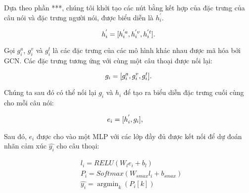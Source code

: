 Dựa theo phần ***,  chúng tôi khởi tạo các nút bằng kết hợp của đặc trưng của câu nói và đặc trưng người nói, được biểu diễn là $h^{'}_{i}$.


\begin{small}
\begin{equation}
    \centering
    h^{'}_{i} = [h^{'a}_{i}, h^{'v}_{i}, h^{'t}_{i}].
\end{equation}
\end{small}
Gọi $g_{i}^a$, $g_{i}^v$ và $g_{i}^t$ là các đặc trưng của các mô hình khác nhau được mã hóa bởi GCN. Các đặc trưng tương ứng với cùng một câu thoại được nối lại: 

\begin{small}
\begin{equation}
    \centering
    g_{i} = [g_{i}^a, g_{i}^v, g_{i}^t].
\end{equation}
\end{small}
Chúng ta sau đó có thể nối lại $g_{i}$ và $h_{i}$ để tạo ra biểu diễn đặc trưng cuối cùng cho mỗi câu nói: 

\begin{small}
\begin{align}
    \centering
    &e_{i} = [h^{'}_{i}, g_{i}] ,
\end{align}
\end{small}

Sau đó, $e_{i}$  được cho vào một MLP với các lớp đầy đủ được kết nối để dự đoán nhãn cảm xúc $\hat{y_{i}}$ cho câu thoại:

\begin{small}
\begin{equation}
\begin{aligned}
    &l_{i} = RELU(W_{l}e_{i}+b_{l})\\
    &P_{i} = Softmax(W_{smax}l_{i}+b_{smax})\\
    &\hat{y_{i}} = \mathop{\arg\min}_{k} (P_{i}[k])
\end{aligned}
\end{equation}
\end{small}



